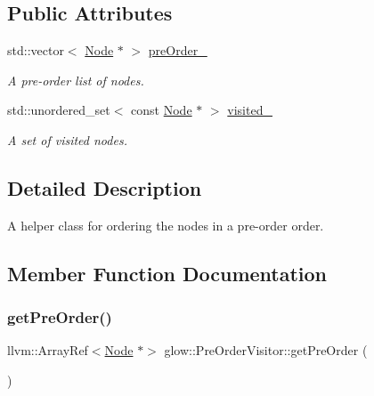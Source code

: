 \subsection*{Public Attributes}
\begin{DoxyCompactItemize}
\item 
\mbox{\label{structglow_1_1_pre_order_visitor_a7384a0036559a39c48378e8e85f36be9}} 
std\+::vector$<$ \hyperlink{classglow_1_1_node}{Node} $\ast$ $>$ \hyperlink{structglow_1_1_pre_order_visitor_a7384a0036559a39c48378e8e85f36be9}{pre\+Order\+\_\+}
\begin{DoxyCompactList}\small\item\em A pre-\/order list of nodes. \end{DoxyCompactList}\item 
\mbox{\label{structglow_1_1_pre_order_visitor_a99cad2d52c3b864d6e736fc596f491f0}} 
std\+::unordered\+\_\+set$<$ const \hyperlink{classglow_1_1_node}{Node} $\ast$ $>$ \hyperlink{structglow_1_1_pre_order_visitor_a99cad2d52c3b864d6e736fc596f491f0}{visited\+\_\+}
\begin{DoxyCompactList}\small\item\em A set of visited nodes. \end{DoxyCompactList}\end{DoxyCompactItemize}


\subsection{Detailed Description}
A helper class for ordering the nodes in a pre-\/order order. 

\subsection{Member Function Documentation}
\mbox{\label{structglow_1_1_pre_order_visitor_a255e69ad29413aa03ee4c068316100ad}} 
\subsubsection{\texorpdfstring{get\+Pre\+Order()}{getPreOrder()}}
{\footnotesize\ttfamily llvm\+::\+Array\+Ref$<$\hyperlink{classglow_1_1_node}{Node} $\ast$$>$ glow\+::\+Pre\+Order\+Visitor\+::get\+Pre\+Order (\begin{DoxyParamCaption}{ }\end{DoxyParamCaption})\hspace{0.3cm}{\ttfamily [inline]}}

